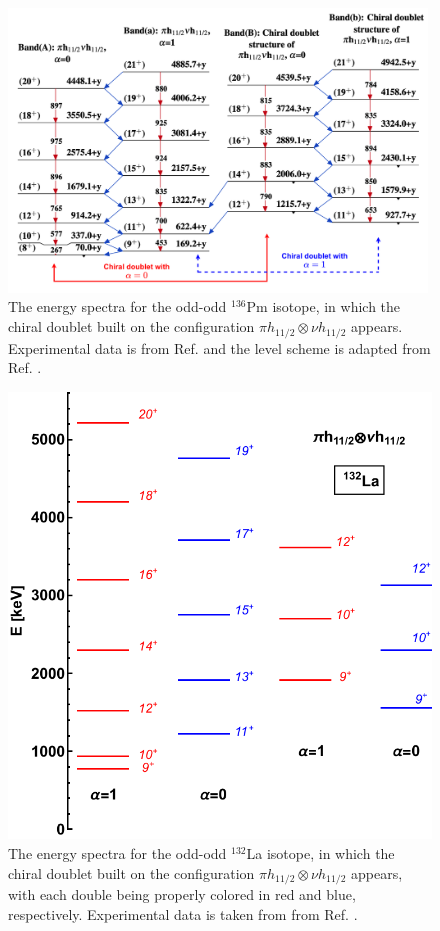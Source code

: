 \begin{figure}
    \centering
    \includegraphics[width=0.99\textwidth]{Chapters/Figures/Chiral_136Pm.pdf}
    \caption{The energy spectra for the odd-odd $^{136}$Pm isotope, in which the chiral doublet built on the configuration $\pi h_{11/2}\otimes\nu h_{11/2}$ appears. Experimental data is from Ref. \cite{mccutchan2018nuclear} and the level scheme is adapted from Ref. \cite{bhat1992evaluated}.}
    \label{chiral-bands-1}
\end{figure}

\begin{figure}
    \centering
    \includegraphics[scale=0.7]{Chapters/Figures/chiral_bands_132La.pdf}
    \caption{The energy spectra for the odd-odd $^{132}$La isotope, in which the chiral doublet built on the configuration $\pi h_{11/2}\otimes\nu h_{11/2}$ appears, with each double being properly colored in red and blue, respectively. Experimental data is taken from from Ref. \cite{grodner2004dsam,grodner2005lifetime}.}
    \label{chiral-bands-2}
\end{figure}

